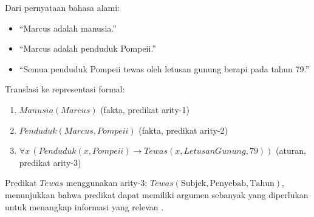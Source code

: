 \begin{contoh}
Dari pernyataan bahasa alami:
\begin{itemize}
    \item ``Marcus adalah manusia.''
    \item ``Marcus adalah penduduk Pompeii.''
    \item ``Semua penduduk Pompeii tewas oleh letusan gunung berapi pada tahun 79.''
\end{itemize}

Translasi ke representasi formal:
\begin{enumerate}
    \item $Manusia(Marcus)$ \hfill (fakta, predikat arity-1)
    \item $Penduduk(Marcus, Pompeii)$ \hfill (fakta, predikat arity-2)
    \item $\forall x\, (Penduduk(x, Pompeii) \rightarrow Tewas(x, LetusanGunung, 79))$ \hfill (aturan, predikat arity-3)
\end{enumerate}

Predikat $Tewas$ menggunakan arity-3: $Tewas(\text{Subjek}, \text{Penyebab}, \text{Tahun})$, menunjukkan bahwa predikat dapat memiliki argumen sebanyak yang diperlukan untuk menangkap informasi yang relevan \cite{wiki_knowledge_base}.
\end{contoh}
